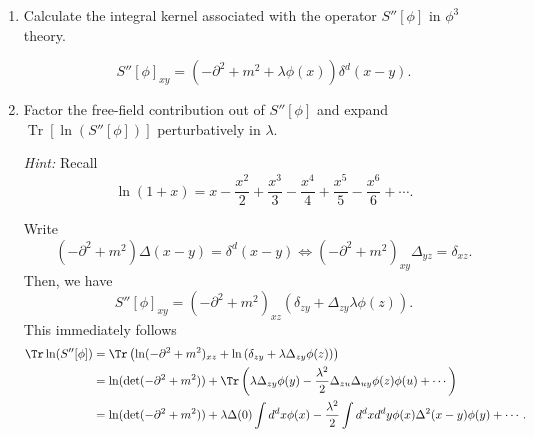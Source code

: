 \begin{enumerate}[label=\alph*)]
    \item Calculate the integral kernel associated with the operator
    $S''[\phi]$ in $\phi^3$ theory.
    \begin{solution}
        \begin{equation}
            S''[\phi]_{xy} = \left(-\partial^2 + m^2 + \lambda\phi(x)\right)\delta^d(x-y).
        \end{equation}
    \end{solution}

    \item Factor the free-field contribution out of $S''[\phi]$ and expand
    $\operatorname{Tr}[\ln(S''[\phi])]$ perturbatively in $\lambda$.

    \textit{Hint:} Recall
    \begin{equation}
        \ln(1+x)
        =x-\frac{x^2}{2}+\frac{x^3}{3}-\frac{x^4}{4}
        +\frac{x^5}{5}-\frac{x^6}{6}+\cdots.
    \end{equation}
    \begin{solution}
        Write
        \begin{equation}
            (-\partial^2+m^2)\Delta(x-y) = \delta^d(x-y) \iff (-\partial^2 +m^2)_{xy}\Delta_{yz} = \delta_{xz}.
        \end{equation}
        Then, we have
        \begin{equation}
            S''[\phi]_{xy} = (-\partial^2+m^2)_{xz}\left(\delta_{zy} +  \Delta_{zy} \lambda\phi(z)\right).
        \end{equation}
        This immediately follows
        \begin{equation}
        \begin{aligned}
            \Tr \ln (S''[\phi]) &= \Tr \left(\ln(-\partial^2 +m^2)_{xz} + \ln\left(\delta_{zy}+ \lambda\Delta_{zy}\phi(z)\right)\right)\\
            &=\ln(\det(-\partial^2 +m^2)) + \Tr\left(\lambda\Delta_{zy}\phi(y) - \frac{\lambda^2}{2}\Delta_{zu}\Delta_{uy}\phi(z)\phi(u) + \cdots\right)\\
            &=\ln(\det(-\partial^2 +m^2)) + \lambda\Delta(0)\int d^dx \phi(x) - \frac{\lambda^2}{2}\int d^dx d^dy\phi(x)\Delta^2(x-y)\phi(y) + \cdots.
        \end{aligned}
        \end{equation}
    \end{solution}


\end{enumerate}
